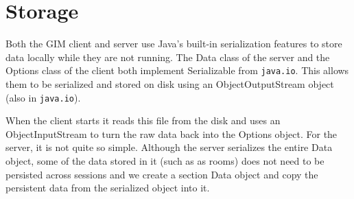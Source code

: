 \section{Storage}
\label{storage}

Both the GIM client and server use Java's built-in serialization features to store data locally while they are not running. The Data class of the server and the Options class of the client both implement Serializable from \texttt{java.io}. This allows them to be serialized and stored on disk using an ObjectOutputStream object (also in \texttt{java.io}).

When the client starts it reads this file from the disk and uses an ObjectInputStream to turn the raw data back into the Options object. For the server, it is not quite so simple. Although the server serializes the entire Data object, some of the data stored in it (such as as rooms) does not need to be persisted across sessions and we create a section Data object and copy the persistent data from the serialized object into it.
